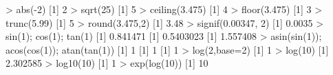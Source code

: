 \documentclass[
]{book}
\newenvironment{Shaded}{\begin{snugshade}}{\end{snugshade}}
\newcommand{\AttributeTok}[1]{\textcolor[rgb]{0.77,0.63,0.00}{#1}}
\newcommand{\DecValTok}[1]{\textcolor[rgb]{0.00,0.00,0.81}{#1}}
\newcommand{\FloatTok}[1]{\textcolor[rgb]{0.00,0.00,0.81}{#1}}
\newcommand{\FunctionTok}[1]{\textcolor[rgb]{0.00,0.00,0.00}{#1}}
\newcommand{\NormalTok}[1]{#1}
\newcommand{\SpecialCharTok}[1]{\textcolor[rgb]{0.00,0.00,0.00}{#1}}
\begin{document}
\begin{Shaded}
\begin{Highlighting}[]
\SpecialCharTok{\textgreater{}} \FunctionTok{abs}\NormalTok{(}\SpecialCharTok{{-}}\DecValTok{2}\NormalTok{)}
\NormalTok{[}\DecValTok{1}\NormalTok{] }\DecValTok{2}
\SpecialCharTok{\textgreater{}} \FunctionTok{sqrt}\NormalTok{(}\DecValTok{25}\NormalTok{)}
\NormalTok{[}\DecValTok{1}\NormalTok{] }\DecValTok{5}
\SpecialCharTok{\textgreater{}} \FunctionTok{ceiling}\NormalTok{(}\FloatTok{3.475}\NormalTok{)}
\NormalTok{[}\DecValTok{1}\NormalTok{] }\DecValTok{4}
\SpecialCharTok{\textgreater{}} \FunctionTok{floor}\NormalTok{(}\FloatTok{3.475}\NormalTok{)}
\NormalTok{[}\DecValTok{1}\NormalTok{] }\DecValTok{3}
\SpecialCharTok{\textgreater{}} \FunctionTok{trunc}\NormalTok{(}\FloatTok{5.99}\NormalTok{)}
\NormalTok{[}\DecValTok{1}\NormalTok{] }\DecValTok{5}
\SpecialCharTok{\textgreater{}} \FunctionTok{round}\NormalTok{(}\FloatTok{3.475}\NormalTok{,}\DecValTok{2}\NormalTok{)}
\NormalTok{[}\DecValTok{1}\NormalTok{] }\FloatTok{3.48}
\SpecialCharTok{\textgreater{}} \FunctionTok{signif}\NormalTok{(}\FloatTok{0.00347}\NormalTok{, }\DecValTok{2}\NormalTok{)}
\NormalTok{[}\DecValTok{1}\NormalTok{] }\FloatTok{0.0035}
\SpecialCharTok{\textgreater{}} \FunctionTok{sin}\NormalTok{(}\DecValTok{1}\NormalTok{); }\FunctionTok{cos}\NormalTok{(}\DecValTok{1}\NormalTok{); }\FunctionTok{tan}\NormalTok{(}\DecValTok{1}\NormalTok{)}
\NormalTok{[}\DecValTok{1}\NormalTok{] }\FloatTok{0.841471}
\NormalTok{[}\DecValTok{1}\NormalTok{] }\FloatTok{0.5403023}
\NormalTok{[}\DecValTok{1}\NormalTok{] }\FloatTok{1.557408}
\SpecialCharTok{\textgreater{}} \FunctionTok{asin}\NormalTok{(}\FunctionTok{sin}\NormalTok{(}\DecValTok{1}\NormalTok{)); }\FunctionTok{acos}\NormalTok{(}\FunctionTok{cos}\NormalTok{(}\DecValTok{1}\NormalTok{)); }\FunctionTok{atan}\NormalTok{(}\FunctionTok{tan}\NormalTok{(}\DecValTok{1}\NormalTok{))}
\NormalTok{[}\DecValTok{1}\NormalTok{] }\DecValTok{1}
\NormalTok{[}\DecValTok{1}\NormalTok{] }\DecValTok{1}
\NormalTok{[}\DecValTok{1}\NormalTok{] }\DecValTok{1}
\SpecialCharTok{\textgreater{}} \FunctionTok{log}\NormalTok{(}\DecValTok{2}\NormalTok{,}\AttributeTok{base=}\DecValTok{2}\NormalTok{)}
\NormalTok{[}\DecValTok{1}\NormalTok{] }\DecValTok{1}
\SpecialCharTok{\textgreater{}} \FunctionTok{log}\NormalTok{(}\DecValTok{10}\NormalTok{)}
\NormalTok{[}\DecValTok{1}\NormalTok{] }\FloatTok{2.302585}
\SpecialCharTok{\textgreater{}} \FunctionTok{log10}\NormalTok{(}\DecValTok{10}\NormalTok{)}
\NormalTok{[}\DecValTok{1}\NormalTok{] }\DecValTok{1}
\SpecialCharTok{\textgreater{}} \FunctionTok{exp}\NormalTok{(}\FunctionTok{log}\NormalTok{(}\DecValTok{10}\NormalTok{))}
\NormalTok{[}\DecValTok{1}\NormalTok{] }\DecValTok{10}
\end{Highlighting}
\end{Shaded}
\end{document}

